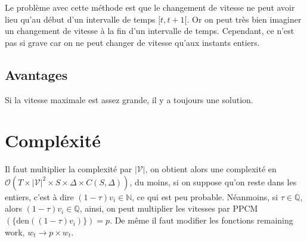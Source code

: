 \documentclass[10pt,a4paper]{article}
\begin{document}
Le problème avec cette méthode est que le changement de vitesse ne
peut avoir lieu qu'au début d'un intervalle de temps $[t, t+1[$. Or on
peut très bien imaginer un changement de vitesse à la fin d'un
intervalle de temps. Cependant, ce n'est pas si grave car on ne peut
changer de vitesse qu'aux instants entiers.

\subsection{Avantages}

Si la vitesse maximale est assez grande, il y a toujours une solution.

\section{Compléxité}

Il faut multiplier la complexité par $|\mathcal{V}|$, on obtient alors
une complexité en $\mathcal{O}(T\times|\mathcal{V}|^2 \times
S\times\Delta\times C(S,\Delta))$, du moins, si on suppose qu'on reste
dans les entiers, c'est à dire $(1-\tau)v_i\in\mathbb{N}$, ce qui est
peu probable. Néanmoins, si $\tau\in\mathbb{Q}$, alors
$(1-\tau)v_i\in\mathbb{Q}$, ainsi, on peut multiplier les vitesses par
PPCM$(\{\text{den}((1-\tau)v_i)\})=p$. De même il faut modifier les
fonctions remaining work, $w_t\rightarrow p\times w_t$.
\end{document}
